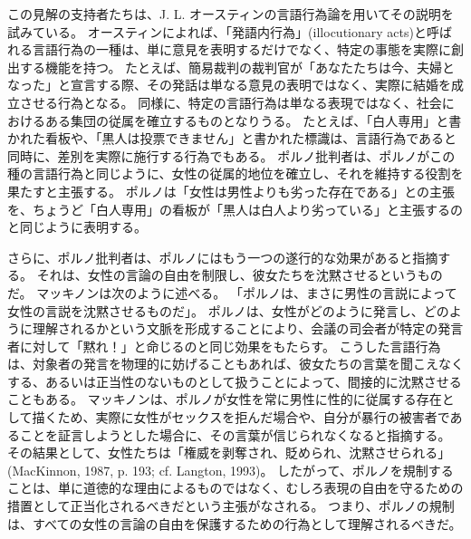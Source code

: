 \documentclass[paper=a4,book,openany]{jlreq}
\begin{document}
この見解の支持者たちは、J. L. オースティンの言語行為論を用いてその説明を試みている。
オースティンによれば、「発語内行為」(illocutionary acts)と呼ばれる言語行為の一種は、単に意見を表明するだけでなく、特定の事態を実際に創出する機能を持つ\citep[pp. 116ff, 121, 139]{austin75:_how_to_do_thing_with_words}。
たとえば、簡易裁判の裁判官が「あなたたちは今、夫婦となった」と宣言する際、その発話は単なる意見の表明ではなく、実際に結婚を成立させる行為となる。
同様に、特定の言語行為は単なる表現ではなく、社会におけるある集団の従属を確立するものとなりうる。
たとえば、「白人専用」と書かれた看板や、「黒人は投票できません」と書かれた標識は、言語行為であると同時に、差別を実際に施行する行為でもある。
ポルノ批判者は、ポルノがこの種の言語行為と同じように、女性の従属的地位を確立し、それを維持する役割を果たすと主張する。
ポルノは「女性は男性よりも劣った存在である」との主張を、ちょうど「白人専用」の看板が「黒人は白人より劣っている」と主張するのと同じように表明する。

さらに、ポルノ批判者は、ポルノにはもう一つの遂行的な効果があると指摘する。
それは、女性の言論の自由を制限し、彼女たちを沈黙させるというものだ。
マッキノンは次のように述べる。
「ポルノは、まさに男性の言説によって女性の言説を沈黙させるものだ」\citep[pp. 209--209]{mackinnon87:_femin_unmod}。
ポルノは、女性がどのように発言し、どのように理解されるかという文脈を形成することにより、会議の司会者が特定の発言者に対して「黙れ！」と命じるのと同じ効果をもたらす。
こうした言語行為は、対象者の発言を物理的に妨げることもあれば、彼女たちの言葉を聞こえなくする、あるいは正当性のないものとして扱うことによって、間接的に沈黙させることもある。
マッキノンは、ポルノが女性を常に男性に性的に従属する存在として描くため、実際に女性がセックスを拒んだ場合や、自分が暴行の被害者であることを証言しようとした場合に、その言葉が信じられなくなると指摘する。
その結果として、女性たちは「権威を剥奪され、貶められ、沈黙させられる」(MacKinnon, 1987, p. 193; cf. Langton, 1993)\nocite{langton93:_speec_acts_and_unspeak_acts}。
したがって、ポルノを規制することは、単に道徳的な理由によるものではなく、むしろ表現の自由を守るための措置として正当化されるべきだという主張がなされる。
つまり、ポルノの規制は、すべての女性の言論の自由を保護するための行為として理解されるべきだ。
\end{document}
